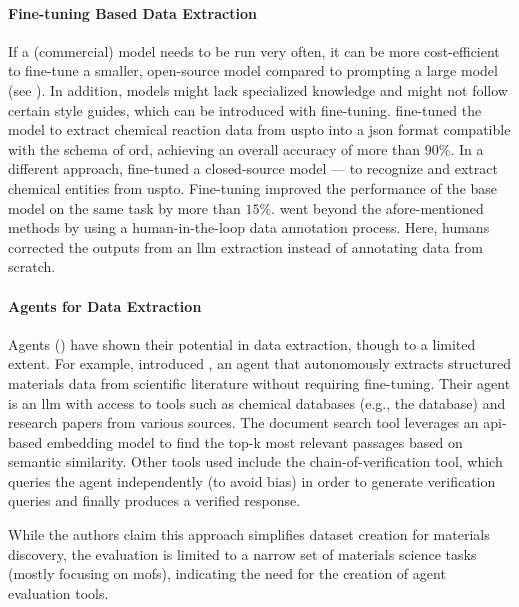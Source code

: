 \paragraph{Fine-tuning Based Data Extraction} 

If a (commercial) model needs to be run very often, it can be more cost-efficient to fine-tune a smaller, open-source model compared to prompting a large model (see ). 
In addition, models might lack specialized knowledge and might not follow certain style guides, which can be introduced with fine-tuning. 
\textcite{ai2024extracting} fine-tuned the  model to extract chemical reaction data from \gls{uspto} into a \gls{json} format compatible with the schema of \gls{ord}\autocite{Kearnes_2021}, achieving an overall accuracy of more than $90\%$. 
In a different approach, \textcite{zhang2024fine} fine-tuned a closed-source model ---  to recognize and extract chemical entities from \gls{uspto}. Fine-tuning improved the performance of the base model on the same task by more than $15\%$. 
\textcite{dagdelen2024structured} went beyond the afore-mentioned methods by using a human-in-the-loop data annotation process. Here, humans corrected the outputs from an \gls{llm} extraction instead of annotating data from scratch.

\paragraph{Agents for Data Extraction} 

Agents () have shown their potential in data extraction, though to a limited extent.\autocite{chen2024autonomous,kang2024chatmof}
For example, \textcite{ansari2024agent} introduced , an agent that autonomously extracts structured materials data from scientific literature without requiring fine-tuning. Their agent is an \gls{llm} with access to tools such as chemical databases (e.g., the  database) and research papers from various sources. The document search tool leverages an \gls{api}-based embedding model to find the top-k most relevant passages based on semantic similarity. Other tools used include the chain-of-verification tool, which queries the agent independently (to avoid bias) in order to generate verification queries and finally produces a verified response.

While the authors claim this approach simplifies dataset creation for materials discovery, the evaluation is limited to a narrow set of materials science tasks (mostly focusing on \glspl{mof}), indicating the need for the creation of agent evaluation tools.


